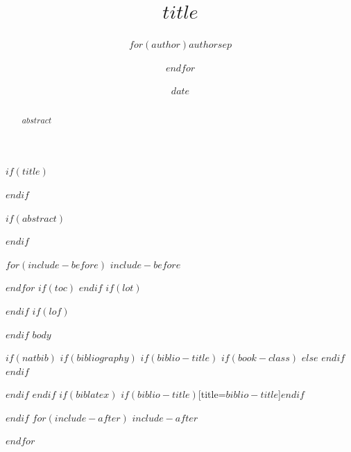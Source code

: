\documentclass{tufte-handout}
\title{$title$}
\author{$for(author)$$author$$sep$ \and $endfor$}
\date{$date$}
\begin{document}
$if(title)$
\maketitle
$endif$
 
\bigskip

$if(abstract)$
\begin{abstract}
$abstract$
\end{abstract}
$endif$

$for(include-before)$
$include-before$

$endfor$
$if(toc)$
{
\hypersetup{linkcolor=$if(toccolor)$$toccolor$$else$black$endif$}
\setcounter{tocdepth}{$toc-depth$}
\tableofcontents
}
$endif$
$if(lot)$
\listoftables
$endif$
$if(lof)$
\listoffigures
$endif$
$body$

$if(natbib)$
$if(bibliography)$
$if(biblio-title)$
$if(book-class)$
\renewcommand\bibname{$biblio-title$}
$else$
\renewcommand\refname{$biblio-title$}
$endif$
$endif$


$endif$
$endif$
$if(biblatex)$
\printbibliography$if(biblio-title)$[title=$biblio-title$]$endif$

$endif$
$for(include-after)$
$include-after$

$endfor$
\end{document}
